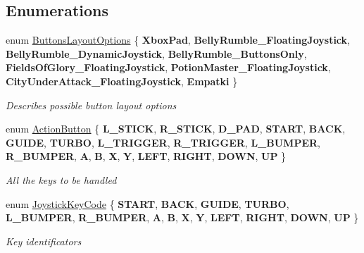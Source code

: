 \subsection*{Enumerations}
\begin{DoxyCompactItemize}
\item 
enum \mbox{\hyperlink{namespace_game_pad_ad65f651e47321df25402246e8df26c37}{Buttons\+Layout\+Options}} \{ \newline
{\bfseries Xbox\+Pad}, 
{\bfseries Belly\+Rumble\+\_\+\+Floating\+Joystick}, 
{\bfseries Belly\+Rumble\+\_\+\+Dynamic\+Joystick}, 
{\bfseries Belly\+Rumble\+\_\+\+Buttons\+Only}, 
\newline
{\bfseries Fields\+Of\+Glory\+\_\+\+Floating\+Joystick}, 
{\bfseries Potion\+Master\+\_\+\+Floating\+Joystick}, 
{\bfseries City\+Under\+Attack\+\_\+\+Floating\+Joystick}, 
{\bfseries Empatki}
 \}
\begin{DoxyCompactList}\small\item\em Describes possible button layout options \end{DoxyCompactList}\item 
enum \mbox{\hyperlink{namespace_game_pad_a44223473808aa2a8e5df26ad04b2f0ec}{Action\+Button}} \{ \newline
{\bfseries L\+\_\+\+S\+T\+I\+CK}, 
{\bfseries R\+\_\+\+S\+T\+I\+CK}, 
{\bfseries D\+\_\+\+P\+AD}, 
{\bfseries S\+T\+A\+RT}, 
\newline
{\bfseries B\+A\+CK}, 
{\bfseries G\+U\+I\+DE}, 
{\bfseries T\+U\+R\+BO}, 
{\bfseries L\+\_\+\+T\+R\+I\+G\+G\+ER}, 
\newline
{\bfseries R\+\_\+\+T\+R\+I\+G\+G\+ER}, 
{\bfseries L\+\_\+\+B\+U\+M\+P\+ER}, 
{\bfseries R\+\_\+\+B\+U\+M\+P\+ER}, 
{\bfseries A}, 
\newline
{\bfseries B}, 
{\bfseries X}, 
{\bfseries Y}, 
{\bfseries L\+E\+FT}, 
\newline
{\bfseries R\+I\+G\+HT}, 
{\bfseries D\+O\+WN}, 
{\bfseries UP}
 \}
\begin{DoxyCompactList}\small\item\em All the keys to be handled \end{DoxyCompactList}\item 
enum \mbox{\hyperlink{namespace_game_pad_ac76b16e8c3ac78facd993c355ab2c337}{Joystick\+Key\+Code}} \{ \newline
{\bfseries S\+T\+A\+RT}, 
{\bfseries B\+A\+CK}, 
{\bfseries G\+U\+I\+DE}, 
{\bfseries T\+U\+R\+BO}, 
\newline
{\bfseries L\+\_\+\+B\+U\+M\+P\+ER}, 
{\bfseries R\+\_\+\+B\+U\+M\+P\+ER}, 
{\bfseries A}, 
{\bfseries B}, 
\newline
{\bfseries X}, 
{\bfseries Y}, 
{\bfseries L\+E\+FT}, 
{\bfseries R\+I\+G\+HT}, 
\newline
{\bfseries D\+O\+WN}, 
{\bfseries UP}
 \}
\begin{DoxyCompactList}\small\item\em Key identificators \end{DoxyCompactList}\end{DoxyCompactItemize}


